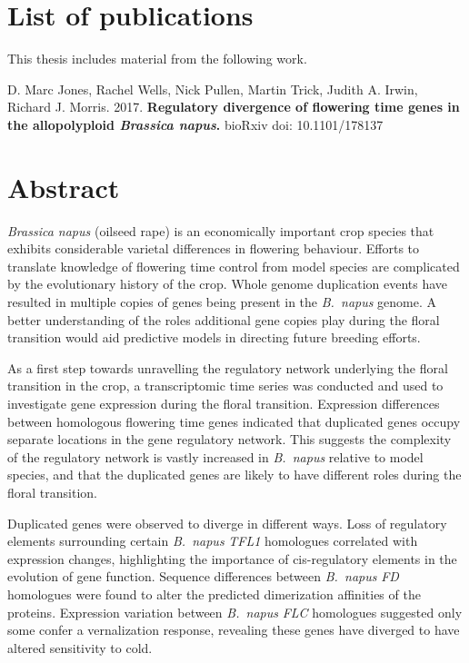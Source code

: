 \documentclass[12pt,]{book}
\begin{document}
\chapter*{List of publications}\label{list-of-publications}

This thesis includes material from the following work.

D. Marc Jones, Rachel Wells, Nick Pullen, Martin Trick, Judith A. Irwin,
Richard J. Morris. 2017. \textbf{Regulatory divergence of flowering time
genes in the allopolyploid \emph{Brassica napus}.} bioRxiv doi:
10.1101/178137

\chapter*{Abstract}\label{chapter:abstract}

\emph{Brassica napus} (oilseed rape) is an economically important crop
species that exhibits considerable varietal differences in flowering
behaviour. Efforts to translate knowledge of flowering time control from
model species are complicated by the evolutionary history of the crop.
Whole genome duplication events have resulted in multiple copies of
genes being present in the \emph{B.~napus} genome. A better
understanding of the roles additional gene copies play during the floral
transition would aid predictive models in directing future breeding
efforts.

As a first step towards unravelling the regulatory network underlying
the floral transition in the crop, a transcriptomic time series was
conducted and used to investigate gene expression during the floral
transition. Expression differences between homologous flowering time
genes indicated that duplicated genes occupy separate locations in the
gene regulatory network. This suggests the complexity of the regulatory
network is vastly increased in \emph{B.~napus} relative to model
species, and that the duplicated genes are likely to have different
roles during the floral transition.

Duplicated genes were observed to diverge in different ways. Loss of
regulatory elements surrounding certain \emph{B.~napus} \emph{TFL1}
homologues correlated with expression changes, highlighting the
importance of cis-regulatory elements in the evolution of gene function.
Sequence differences between \emph{B.~napus} \emph{FD} homologues were
found to alter the predicted dimerization affinities of the proteins.
Expression variation between \emph{B.~napus} \emph{FLC} homologues
suggested only some confer a vernalization response, revealing these
genes have diverged to have altered sensitivity to cold.
\end{document}
